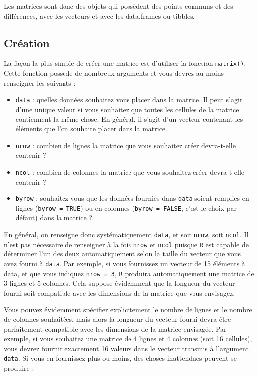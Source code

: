 \documentclass[
  french,
  a4paper,
  DIV=11,
  numbers=noendperiod,
  oneside]{scrreprt}
\providecommand{\tightlist}{%
  \setlength{\itemsep}{0pt}\setlength{\parskip}{0pt}}
\begin{document}
\begin{tcolorbox}
Les matrices sont donc des objets qui possèdent des points communs et
des différences, avec les vecteurs et avec les data.frames ou tibbles.

\subsection{Création}\label{cruxe9ation}

La façon la plus simple de créer une matrice est d'utiliser la fonction
\texttt{matrix()}. Cette fonction possède de nombreux arguments et vous
devrez au moins renseigner les suivants :

\begin{itemize}
\tightlist
\item
  \texttt{data} : quelles données souhaitez vous placer dans la matrice.
  Il peut s'agir d'une unique valeur si vous souhaitez que toutes les
  cellules de la matrice contiennent la même chose. En général, il
  s'agit d'un vecteur contenant les éléments que l'on souhaite placer
  dans la matrice.
\item
  \texttt{nrow} : combien de lignes la matrice que vous souhaitez créer
  devra-t-elle contenir ?
\item
  \texttt{ncol} : combien de colonnes la matrice que vous souhaitez
  créer devra-t-elle contenir ?
\item
  \texttt{byrow} : souhaitez-vous que les données fournies dans
  \texttt{data} soient remplies en lignes (\texttt{byrow\ =\ TRUE}) ou
  en colonnes (\texttt{byrow\ =\ FALSE}, c'est le choix par défaut) dans
  la matrice ?
\end{itemize}

En général, on renseigne donc systématiquement \texttt{data}, et soit
\texttt{nrow}, soit \texttt{ncol}. Il n'est pas nécessaire de renseigner
à la fois \texttt{nrow} et \texttt{ncol} puisque \texttt{R} est capable
de déterminer l'un des deux automatiquement selon la taille du vecteur
que vous avez fourni à \texttt{data}. Par exemple, si vous fournissez un
vecteur de 15 éléments à data, et que vous indiquez \texttt{nrow\ =\ 3},
\texttt{R} produira automatiquement une matrice de 3 lignes et 5
colonnes. Cela suppose évidemment que la longueur du vecteur fourni soit
compatible avec les dimensions de la matrice que vous envisagez.

Vous pouvez évidemment spécifier explicitement le nombre de lignes et le
nombre de colonnes souhaitées, mais alors la longueur du vecteur fourni
devra être parfaitement compatible avec les dimensions de la matrice
envisagée. Par exemple, si vous souhaitez une matrice de 4 lignes et 4
colonnes (soit 16 cellules), vous devrez fournir exactement 16 valeurs
dans le vecteur transmis à l'argument \texttt{data}. Si vous en
fournissez plus ou moins, des choses inattendues peuvent se produire :


\end{tcolorbox}
\end{document}
